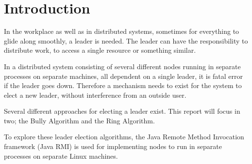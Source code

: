 \chapter{Introduction}
In the workplace as well as in distributed systems, sometimes for everything to glide along smoothly, a leader is needed. 
The leader can have the responsibility to distribute work, to access a single resource or something similar.                                                                                                                                                                                                                                                                                                                                                 

In a distributed system consisting of several different nodes running in separate processes on separate machines, all dependent on a single leader, it is fatal error if the leader goes down. Therefore a mechanism needs to exist for the system to elect a new leader, without interference from an outside user. 

Several different approaches for electing a leader exist. This report will focus in two; the Bully Algorithm and the Ring Algorithm. 

To explore these leader election algorithms, the Java Remote Method Invocation framework (Java RMI) is used for implementing nodes to run in separate processes on separate Linux machines. 